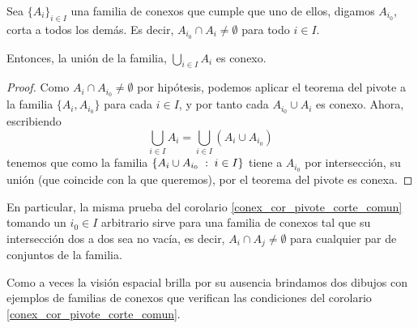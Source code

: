 \begin{cor}
	\label{conex_cor_pivote_corte_comun}
	Sea $\{A_i\}_{i\in I}$ una familia de conexos que cumple que uno de ellos, digamos $A_{i_0}$, corta a todos los demás. Es decir, $A_{i_0}\cap A_i\not=\emptyset$ para todo $i\in I$.
	
	Entonces, la unión de la familia, $\bigcup_{i\in I} A_i$ es conexo.
\end{cor}
\begin{proof}
	Como $A_i\cap A_{i_0}\neq\emptyset$ por hipótesis, podemos aplicar el teorema del pivote a la familia $\{A_i,A_{i_0}\}$ para cada $i\in I$, y por tanto cada $A_{i_0}\cup A_i$ es conexo. Ahora, escribiendo
	\[\bigcup_{i\in I} A_i = \bigcup_{i\in I} (A_i\cup A_{i_0})\]
	tenemos que como la familia $\{A_i\cup A_{i_0}\;:\; i\in I\}$ tiene a $A_{i_0}$ por intersección, su unión (que coincide con la que queremos), por el teorema del pivote es conexa.
\end{proof}
\begin{obs}
	En particular, la misma prueba del corolario \ref{conex_cor_pivote_corte_comun} tomando un $i_0\in I$ arbitrario sirve para una familia de conexos tal que su intersección dos a dos sea no vacía, es decir, $A_i\cap A_j\not=\emptyset$ para cualquier par de conjuntos de la familia.
\end{obs}
Como a veces la visión espacial brilla por su ausencia brindamos dos dibujos con ejemplos de familias de conexos que verifican las condiciones del corolario \ref{conex_cor_pivote_corte_comun}.
